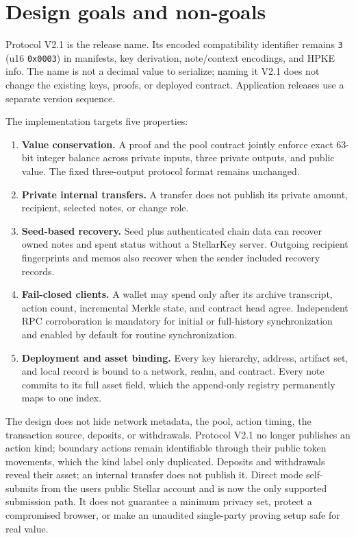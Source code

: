 \documentclass[11pt,letterpaper]{article}
\providecommand{\tightlist}{\setlength{\itemsep}{0pt}\setlength{\parskip}{0pt}}
\begin{document}
\section{Design goals and non-goals}\label{design-goals-and-non-goals}

Protocol V2.1 is the release name. Its encoded compatibility identifier
remains \texttt{3} (u16 \texttt{0x0003}) in manifests, key derivation,
note/\allowbreak{}context encodings, and HPKE info. The name is not a
decimal value to serialize; naming it V2.1 does not change the existing
keys, proofs, or deployed contract. Application releases use a separate
version sequence.

The implementation targets five properties:

\begin{enumerate}
\def\labelenumi{\arabic{enumi}.}
\tightlist
\item
  \textbf{Value conservation.} A proof and the pool contract jointly
  enforce exact 63-bit integer balance across private inputs, three
  private outputs, and public value. The fixed three-output protocol
  format remains unchanged.
\item
  \textbf{Private internal transfers.} A transfer does not publish its
  private amount, recipient, selected notes, or change role.
\item
  \textbf{Seed-based recovery.} Seed plus authenticated chain data can
  recover owned notes and spent status without a StellarKey server.
  Outgoing recipient fingerprints and memos also recover when the sender
  included recovery records.
\item
  \textbf{Fail-closed clients.} A wallet may spend only after its
  archive transcript, action count, incremental Merkle state, and
  contract head agree. Independent RPC corroboration is mandatory for
  initial or full-history synchronization and enabled by default for
  routine synchronization.
\item
  \textbf{Deployment and asset binding.} Every key hierarchy, address,
  artifact set, and local record is bound to a network, realm, and
  contract. Every note commits to its full asset field, which the
  append-only registry permanently maps to one index.
\end{enumerate}

The design does not hide network metadata, the pool, action timing, the
transaction source, deposits, or withdrawals. Protocol V2.1 no longer
publishes an action kind; boundary actions remain identifiable through
their public token movements, which the kind label only duplicated.
Deposits and withdrawals reveal their asset; an internal transfer does
not publish it. Direct mode self-submits from the user\textquotesingle s
public Stellar account and is now the only supported submission path. It
does not guarantee a minimum privacy set, protect a compromised browser,
or make an unaudited single-party proving setup safe for real value.
\end{document}
